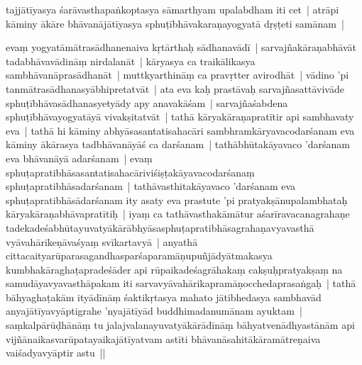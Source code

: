 \documentclass[article,12pt,a4paper]{memoir}%
\newcounter{parCount}
\begin{document}
	  
	  \pstart \leavevmode%
	\label{thakur75-5.10}tajjātīyasya śarāvasthapaṅkoptasya sāmarthyam upalabdham iti cet | atrāpi kāminy ākāre bhāvanājātīyasya sphuṭībhāvakaraṇayogyatā dṛṣṭeti samānam | 
	{}
	\pend%
      

	  
	  \pstart \leavevmode%
	\label{thakur75-5.12}evaṃ yogyatāmātrasādhanenaiva kṛtārthaḥ sādhanavādī | sarvajñakāraṇabhāvāt tadabhāvavādināṃ nirdalanāt | kāryasya ca traikālikasya sambhāvanāprasādhanāt | muttkyarthināṃ ca pravṛtter avirodhāt | vādino 'pi tanmātrasādhanasyābhipretatvāt | ata eva kaḥ prastāvaḥ sarvajñasattāvivāde sphuṭībhāvasādhanasyetyādy apy anavakāśam | sarvajñaśabdena sphuṭībhāvayogyatāyā vivakṣitatvāt | tathā kāryakāraṇapratītir api sambhavaty eva | tathā hi kāminy abhyāsasantatisahacāri sambhramkāryavacodarśanam eva kāminy ākārasya tadbhāvanāyāś ca darśanam | tathābhūtakāyavaco 'darśanam eva bhāvanāyā adarśanam | evaṃ sphuṭapratibhāsasantatisahacāriviśiṣṭakāyavacodarśanaṃ sphuṭapratibhāsadarśanam | tathāvasthitakāyavaco 'darśanam eva sphuṭapratibhāsādarśanam ity asaty eva prastute 'pi pratyakṣānupalambhataḥ kāryakāraṇabhāvapratītiḥ | iyaṃ ca tathāvasthakāmātur aśarīravacanagrahaṇe tadekadeśabhūtayuvatyākārābhyāsasphuṭapratibhāsagrahaṇavyavasthā vyāvahārikeṇāvaśyaṃ svīkartavyā | anyathā \label{ratnakīrtinibandhāvali__36r1PF7IMWYWBFZSMXH00ZADHKO}citta\label{ratnakīrtinibandhāvali__36r1PF7IMWYNUC1RBB38NANZLQM}caityarūparasagandhasparśaparamāṇupuñjādyātmakasya kumbhakāraghaṭapradeśāder api rūpaikadeśagrāhakaṃ cakṣuḥpratyakṣaṃ na samudāyavyavasthāpakam iti sarvavyāvahārikapramāṇocchedaprasaṅgaḥ | tathā bāhyaghaṭakām ityādīnāṃ śaktikṛtasya mahato jātibhedasya sambhavād anyajātīyavyāptigrahe 'nyajātīyād buddhimadanumānam ayuktam | saṃkalpārūḍhānāṃ tu jalajvalanayuvatyākārādīnāṃ bāhyatvenādhyastānām api vijñānaikasvarūpatayaikajātīyatvam astīti bhāvanāsahitākāramātreṇaiva vaiśadyavyāptir astu ||
	{}
	\pend%
      
\end{document}
